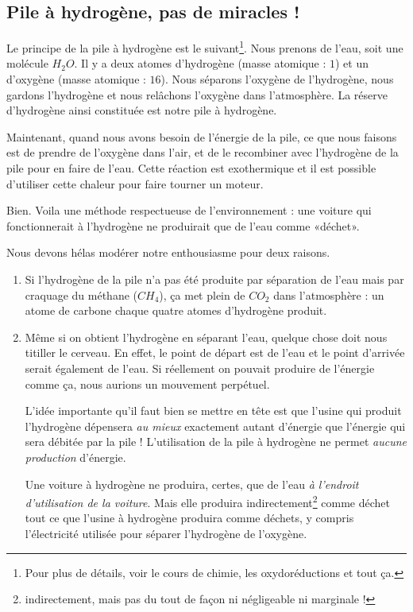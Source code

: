 \documentclass[a4paper,12pt]{book}
\theoremstyle{mes_exemples}	\newtheorem{exemple}[numtho]{Exemple}
\theoremstyle{mes_tho}
\begin{document}
\subsection{Pile à hydrogène, pas de miracles !}

Le principe de la pile à hydrogène est le suivant\footnote{Pour plus de détails, voir le cours de chimie, les oxydoréductions et tout ça.}. Nous prenons de l'eau, soit une molécule $H_2O$. Il y a deux atomes d'hydrogène (masse atomique : $1$) et un d'oxygène (masse atomique : $16$). Nous séparons l'oxygène de l'hydrogène, nous gardons l'hydrogène et nous relâchons l'oxygène dans l'atmosphère. La réserve d'hydrogène ainsi constituée est notre pile à hydrogène.

Maintenant, quand nous avons besoin de l'énergie de la pile, ce que nous faisons est de prendre de l'oxygène dans l'air, et de le recombiner avec l'hydrogène de la pile pour en faire de l'eau. Cette réaction est exothermique et il est possible d'utiliser cette chaleur pour faire tourner un moteur.

\begin{idee}
Bien. Voila une méthode respectueuse de l'environnement : une voiture qui fonctionnerait à l'hydrogène ne produirait que de l'eau comme «déchet».
\end{idee}

Nous devons hélas modérer notre enthousiasme pour deux raisons.

\begin{enumerate}

	\item
		Si l'hydrogène de la pile n'a pas été produite par séparation de l'eau mais par craquage du méthane ($CH_4$), ça met plein de $CO_2$ dans l'atmosphère : un atome de carbone chaque quatre atomes d'hydrogène produit.

	\item
		Même si on obtient l'hydrogène en séparant l'eau, quelque chose doit nous titiller le cerveau. En effet, le point de départ est de l'eau et le point d'arrivée serait également de l'eau. Si réellement on pouvait produire de l'énergie comme ça, nous aurions un mouvement perpétuel.

		L'idée importante qu'il faut bien se mettre en tête est que l'usine qui produit l'hydrogène dépensera \emph{au mieux} exactement autant d'énergie que l'énergie qui sera débitée par la pile ! L'utilisation de la pile à hydrogène ne permet \emph{aucune production} d'énergie.

		Une voiture à hydrogène ne produira, certes, que de l'eau \emph{à l'endroit d'utilisation de la voiture}. Mais elle produira indirectement\footnote{indirectement, mais pas du tout de façon ni négligeable ni marginale !} comme déchet tout ce que l'usine à hydrogène produira comme déchets, y compris l'électricité utilisée pour séparer l'hydrogène de l'oxygène.

\end{enumerate}
\end{document}
